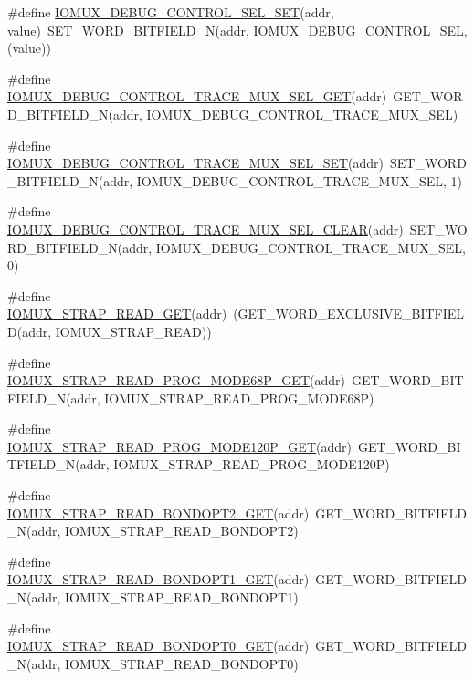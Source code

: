 \begin{DoxyCompactItemize}
\item 
\#define \hyperlink{a00559_afe3d87f782a9f43463d6e311fa0d8ca5}{IOMUX\_\-DEBUG\_\-CONTROL\_\-SEL\_\-SET}(addr, value)~SET\_\-WORD\_\-BITFIELD\_\-N(addr, IOMUX\_\-DEBUG\_\-CONTROL\_\-SEL, (value))
\item 
\#define \hyperlink{a00559_ab3a6269c5e5f07d7fddbe04b9f650f77}{IOMUX\_\-DEBUG\_\-CONTROL\_\-TRACE\_\-MUX\_\-SEL\_\-GET}(addr)~GET\_\-WORD\_\-BITFIELD\_\-N(addr, IOMUX\_\-DEBUG\_\-CONTROL\_\-TRACE\_\-MUX\_\-SEL)
\item 
\#define \hyperlink{a00559_a668f22ea2d63f6d82146532ecb00839e}{IOMUX\_\-DEBUG\_\-CONTROL\_\-TRACE\_\-MUX\_\-SEL\_\-SET}(addr)~SET\_\-WORD\_\-BITFIELD\_\-N(addr, IOMUX\_\-DEBUG\_\-CONTROL\_\-TRACE\_\-MUX\_\-SEL, 1)
\item 
\#define \hyperlink{a00559_a32880d0c290e9c00950e30458f513d3f}{IOMUX\_\-DEBUG\_\-CONTROL\_\-TRACE\_\-MUX\_\-SEL\_\-CLEAR}(addr)~SET\_\-WORD\_\-BITFIELD\_\-N(addr, IOMUX\_\-DEBUG\_\-CONTROL\_\-TRACE\_\-MUX\_\-SEL, 0)
\item 
\#define \hyperlink{a00559_a6a3e2fa2e3ee9320a1967ad2e57cfbdd}{IOMUX\_\-STRAP\_\-READ\_\-GET}(addr)~(GET\_\-WORD\_\-EXCLUSIVE\_\-BITFIELD(addr, IOMUX\_\-STRAP\_\-READ))
\item 
\#define \hyperlink{a00559_aef99cfcd455f0330cf8e5fad3f6be433}{IOMUX\_\-STRAP\_\-READ\_\-PROG\_\-MODE68P\_\-GET}(addr)~GET\_\-WORD\_\-BITFIELD\_\-N(addr, IOMUX\_\-STRAP\_\-READ\_\-PROG\_\-MODE68P)
\item 
\#define \hyperlink{a00559_a6e714b807396d8a9ac18ea1ba89ce263}{IOMUX\_\-STRAP\_\-READ\_\-PROG\_\-MODE120P\_\-GET}(addr)~GET\_\-WORD\_\-BITFIELD\_\-N(addr, IOMUX\_\-STRAP\_\-READ\_\-PROG\_\-MODE120P)
\item 
\#define \hyperlink{a00559_aaea4a6465077c7a9fb04b1577b6e5251}{IOMUX\_\-STRAP\_\-READ\_\-BONDOPT2\_\-GET}(addr)~GET\_\-WORD\_\-BITFIELD\_\-N(addr, IOMUX\_\-STRAP\_\-READ\_\-BONDOPT2)
\item 
\#define \hyperlink{a00559_a320c0628402fc6851e3d1c2732c0afee}{IOMUX\_\-STRAP\_\-READ\_\-BONDOPT1\_\-GET}(addr)~GET\_\-WORD\_\-BITFIELD\_\-N(addr, IOMUX\_\-STRAP\_\-READ\_\-BONDOPT1)
\item 
\#define \hyperlink{a00559_a92a70bcb3b072198de5aac63b90637d7}{IOMUX\_\-STRAP\_\-READ\_\-BONDOPT0\_\-GET}(addr)~GET\_\-WORD\_\-BITFIELD\_\-N(addr, IOMUX\_\-STRAP\_\-READ\_\-BONDOPT0)
\end{DoxyCompactItemize}


